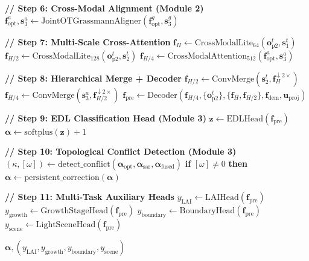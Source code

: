 \begin{algorithm}[h]
\begin{algorithmic}[1]
\State \textbf{// Step 6: Cross-Modal Alignment (Module 2)}
\State $\mathbf{f}_{\text{opt}}^a, \mathbf{s}_3^a \gets
\text{JointOTGrassmannAligner}(\mathbf{f}_{\text{opt}}^g, \mathbf{s}_3^g)$

\State \textbf{// Step 7: Multi-Scale Cross-Attention}
\State $\mathbf{f}_H \gets \text{CrossModalLite}_{64}(\mathbf{o}_{\text{p2}}^t, \mathbf{s}_1^t)$
\State $\mathbf{f}_{H/2} \gets \text{CrossModalLite}_{128}(\mathbf{o}_{\text{p2}}^t, \mathbf{s}_2^t)$
\State $\mathbf{f}_{H/4} \gets \text{CrossModalAttention}_{512}(\mathbf{f}_{\text{opt}}^a,
\mathbf{s}_3^a)$

\State \textbf{// Step 8: Hierarchical Merge + Decoder}
\State $\mathbf{f}_{H/2} \gets \text{ConvMerge}(\mathbf{s}_2^t,
\mathbf{f}_H^{\downarrow 2\times})$
\State $\mathbf{f}_{H/4} \gets \text{ConvMerge}(\mathbf{s}_3^a,
\mathbf{f}_{H/2}^{\downarrow 2\times})$
\State $\mathbf{f}_{\text{pre}} \gets \text{Decoder}(\mathbf{f}_{H/4},
\{\mathbf{o}_{\text{p2}}^t\}, \{\mathbf{f}_H, \mathbf{f}_{H/2}\},
\mathbf{f}_{\text{dem}}, \mathbf{u}_{\text{proj}})$

\State \textbf{// Step 9: EDL Classification Head (Module 3)}
\State $\mathbf{z} \gets \text{EDLHead}(\mathbf{f}_{\text{pre}})$
\State $\boldsymbol{\alpha} \gets \text{softplus}(\mathbf{z}) + 1$

\State \textbf{// Step 10: Topological Conflict Detection (Module 3)}
\State $(\kappa, [\omega]) \gets \text{detect\_conflict}(\boldsymbol{\alpha}_{\text{opt}},
\boldsymbol{\alpha}_{\text{sar}}, \boldsymbol{\alpha}_{\text{fused}})$
\State \textbf{if} $[\omega] \neq 0$ \textbf{then}
    $\boldsymbol{\alpha} \gets \text{persistent\_correction}(\boldsymbol{\alpha})$

\State \textbf{// Step 11: Multi-Task Auxiliary Heads}
\State $y_{\text{LAI}} \gets \text{LAIHead}(\mathbf{f}_{\text{pre}})$
\State $y_{\text{growth}} \gets \text{GrowthStageHead}(\mathbf{f}_{\text{pre}})$
\State $y_{\text{boundary}} \gets \text{BoundaryHead}(\mathbf{f}_{\text{pre}})$
\State $y_{\text{scene}} \gets \text{LightSceneHead}(\mathbf{f}_{\text{pre}})$

\State \Return $\boldsymbol{\alpha}, (y_{\text{LAI}}, y_{\text{growth}},
y_{\text{boundary}}, y_{\text{scene}})$
\end{algorithmic}
\end{algorithm}

